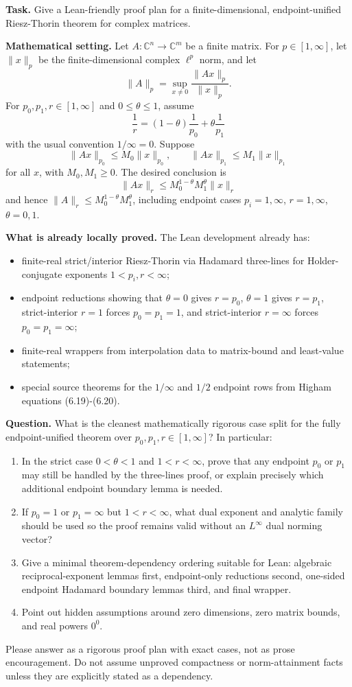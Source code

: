 \textbf{Task.}
Give a Lean-friendly proof plan for a finite-dimensional, endpoint-unified
Riesz-Thorin theorem for complex matrices.

\textbf{Mathematical setting.}
Let \(A : \mathbb C^n \to \mathbb C^m\) be a finite matrix.  For
\(p \in [1,\infty]\), let \(\|x\|_p\) be the finite-dimensional complex
\(\ell^p\) norm, and let
\[
  \|A\|_p = \sup_{x \ne 0} \frac{\|Ax\|_p}{\|x\|_p}.
\]
For \(p_0,p_1,r \in [1,\infty]\) and \(0 \le \theta \le 1\), assume
\[
  \frac1r = (1-\theta)\frac1{p_0}+\theta\frac1{p_1}
\]
with the usual convention \(1/\infty=0\).  Suppose
\[
  \|Ax\|_{p_0}\le M_0\|x\|_{p_0}, \qquad
  \|Ax\|_{p_1}\le M_1\|x\|_{p_1}
\]
for all \(x\), with \(M_0,M_1\ge0\).  The desired conclusion is
\[
  \|Ax\|_r \le M_0^{1-\theta}M_1^\theta\|x\|_r
\]
and hence \(\|A\|_r \le M_0^{1-\theta}M_1^\theta\), including endpoint
cases \(p_i=1,\infty\), \(r=1,\infty\), \(\theta=0,1\).

\textbf{What is already locally proved.}
The Lean development already has:
\begin{itemize}
  \item finite-real strict/interior Riesz-Thorin via Hadamard three-lines for
        Holder-conjugate exponents \(1<p_i,r<\infty\);
  \item endpoint reductions showing that \(\theta=0\) gives \(r=p_0\),
        \(\theta=1\) gives \(r=p_1\), strict-interior \(r=1\) forces
        \(p_0=p_1=1\), and strict-interior \(r=\infty\) forces
        \(p_0=p_1=\infty\);
  \item finite-real wrappers from interpolation data to matrix-bound and
        least-value statements;
  \item special source theorems for the \(1/\infty\) and \(1/2\) endpoint
        rows from Higham equations (6.19)-(6.20).
\end{itemize}

\textbf{Question.}
What is the cleanest mathematically rigorous case split for the fully
endpoint-unified theorem over \(p_0,p_1,r\in[1,\infty]\)?  In particular:
\begin{enumerate}
  \item In the strict case \(0<\theta<1\) and \(1<r<\infty\), prove that any
        endpoint \(p_0\) or \(p_1\) may still be handled by the three-lines
        proof, or explain precisely which additional endpoint boundary lemma is
        needed.
  \item If \(p_0=1\) or \(p_1=\infty\) but \(1<r<\infty\), what dual exponent
        and analytic family should be used so the proof remains valid without
        an \(L^\infty\) dual norming vector?
  \item Give a minimal theorem-dependency ordering suitable for Lean: algebraic
        reciprocal-exponent lemmas first, endpoint-only reductions second,
        one-sided endpoint Hadamard boundary lemmas third, and final wrapper.
  \item Point out hidden assumptions around zero dimensions, zero matrix bounds,
        and real powers \(0^0\).
\end{enumerate}

Please answer as a rigorous proof plan with exact cases, not as prose
encouragement.  Do not assume unproved compactness or norm-attainment facts
unless they are explicitly stated as a dependency.
